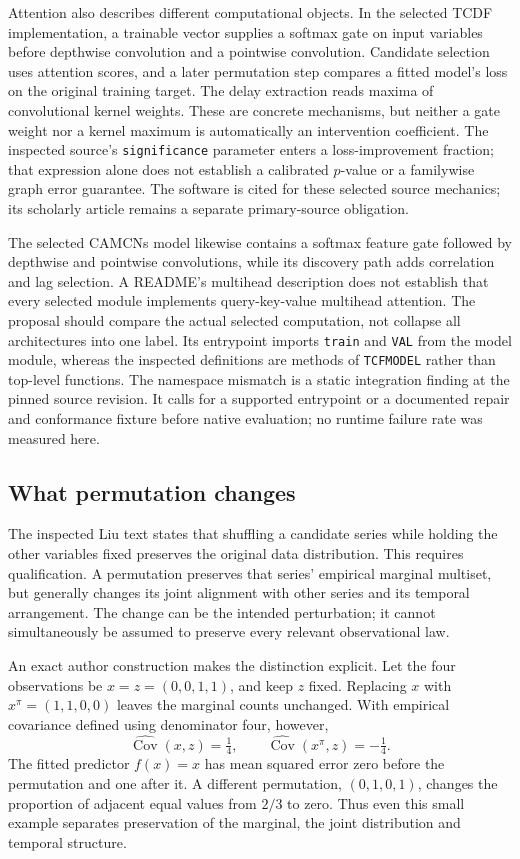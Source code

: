 Attention also describes different computational objects. In the selected TCDF implementation,
a trainable vector supplies a softmax gate on input variables before depthwise convolution and a
pointwise convolution. Candidate selection uses attention scores, and a later permutation step
compares a fitted model's loss on the original training target. The delay extraction reads maxima
of convolutional kernel weights. These are concrete mechanisms, but neither a gate weight nor a
kernel maximum is automatically an intervention coefficient. The inspected source's
\texttt{significance} parameter enters a loss-improvement fraction; that expression alone does
not establish a calibrated $p$-value or a familywise graph error guarantee. The software is cited
for these selected source mechanics; its scholarly article remains a separate primary-source
obligation.~\citep{exec28_at_tcdf}

The selected CAMCNs model likewise contains a softmax feature gate followed by depthwise and
pointwise convolutions, while its discovery path adds correlation and lag selection. A README's
multihead description does not establish that every selected module implements query-key-value
multihead attention. The proposal should compare the actual selected computation, not collapse
all architectures into one label. Its entrypoint imports \texttt{train} and \texttt{VAL} from the
model module, whereas the inspected definitions are methods of \texttt{TCFMODEL} rather than
top-level functions. The namespace mismatch is a static integration finding at the pinned
source revision. It calls for a supported entrypoint or a documented repair and conformance
fixture before native evaluation; no runtime failure rate was measured here.
\citep{exec28_at_camcns}

\subsection{What permutation changes}
The inspected Liu text states that shuffling a candidate series while holding the other variables
fixed preserves the original data distribution. This requires qualification. A permutation
preserves that series' empirical marginal multiset, but generally changes its joint alignment
with other series and its temporal arrangement. The change can be the intended perturbation;
it cannot simultaneously be assumed to preserve every relevant observational law.
\citep{exec28_at_liu}

An exact author construction makes the distinction explicit. Let the four observations be
$x=z=(0,0,1,1)$, and keep $z$ fixed. Replacing $x$ with
$x^\pi=(1,1,0,0)$ leaves the marginal counts unchanged. With empirical covariance defined using
denominator four, however,
\[
 \widehat{\operatorname{Cov}}(x,z)=\tfrac14,
 \qquad \widehat{\operatorname{Cov}}(x^\pi,z)=-\tfrac14.
\]
The fitted predictor $f(x)=x$ has mean squared error zero before the permutation and one
after it. A different permutation, $(0,1,0,1)$, changes the proportion of adjacent equal values
from $2/3$ to zero. Thus even this small example separates preservation of the marginal,
the joint distribution and temporal structure.~\citep{exec28_at_reference}

